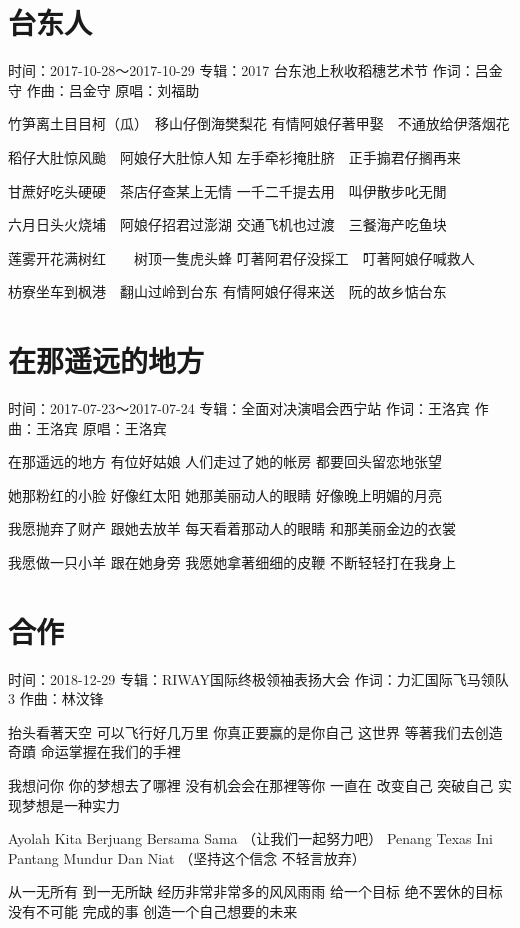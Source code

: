 \documentclass[UTF8,a4paper,oneside,twocolumn,12pt]{ctexbook}
\newcommand{\infopair}[2]{\textbullet #1：#2}
\newcommand{\zc}[1][伍佰]{\infopair{作词}{#1}}
\newcommand{\zq}[1][伍佰]{\infopair{作曲}{#1}}
\newcommand{\zj}[1]{\infopair{专辑}{#1}}
\newcommand{\yc}[1]{\infopair{原唱}{#1}}
\newcommand{\sj}[1]{\infopair{时间}{#1}}
\newenvironment{info}{\begin{flushleft}\kaishu
	}
	{\end{flushleft}\normalsize\yahei\par}
\newenvironment{lyric}{
	}
{}
\begin{document}
\section{台东人}
\begin{info}
	\sj{2017-10-28～2017-10-29}
	\zj{2017 台东池上秋收稻穗艺术节}
	\zc[吕金守]
	\zq[吕金守]
	\yc{刘福助}
\end{info}
\begin{lyric}
	竹笋离土目目柯（瓜）　移山仔倒海樊梨花
	有情阿娘仔著甲娶　不通放给伊落烟花

	稻仔大肚惊风颱　阿娘仔大肚惊人知
	左手牵衫掩肚脐　正手搧君仔搁再来

	甘蔗好吃头硬硬　茶店仔查某上无情
	一千二千提去用　叫伊散步叱无閒

	六月日头火烧埔　阿娘仔招君过澎湖
	交通飞机也过渡　三餐海产吃鱼块

	莲雾开花满树红　　树顶一隻虎头蜂
	叮著阿君仔没採工　叮著阿娘仔喊救人

	枋寮坐车到枫港　翻山过岭到台东
	有情阿娘仔得来送　阮的故乡惦台东
\end{lyric}

\section{在那遥远的地方}%
\begin{info}
	\sj{2017-07-23～2017-07-24}
	\zj{全面对决演唱会西宁站}
	\zc[王洛宾]
	\zq[王洛宾]
	\yc{王洛宾}
\end{info}
\begin{lyric}%
	在那遥远的地方 有位好姑娘
	人们走过了她的帐房 都要回头留恋地张望

	她那粉红的小脸 好像红太阳
	她那美丽动人的眼睛 好像晚上明媚的月亮

	我愿抛弃了财产 跟她去放羊
	每天看着那动人的眼睛 和那美丽金边的衣裳

	我愿做一只小羊 跟在她身旁
	我愿她拿著细细的皮鞭 不断轻轻打在我身上
\end{lyric}

\section{合作}%
\begin{info}
	\sj{2018-12-29}
	\zj{RIWAY国际终极领袖表扬大会}
	\zc[力汇国际飞马领队3]
	\zq[林汶锋]
\end{info}
\begin{lyric}
	抬头看著天空 可以飞行好几万里
	你真正要赢的是你自己
	这世界 等著我们去创造奇蹟
	命运掌握在我们的手裡

	我想问你 你的梦想去了哪裡
	没有机会会在那裡等你
	一直在 改变自己 突破自己
	实现梦想是一种实力

	Ayolah Kita Berjuang Bersama Sama
	（让我们一起努力吧）
	Penang Texas Ini Pantang Mundur Dan Niat
	（坚持这个信念 不轻言放弃）

	从一无所有 到一无所缺
	经历非常非常多的风风雨雨
	给一个目标 绝不罢休的目标
	没有不可能 完成的事
	创造一个自己想要的未来
\end{lyric}
\end{document}
